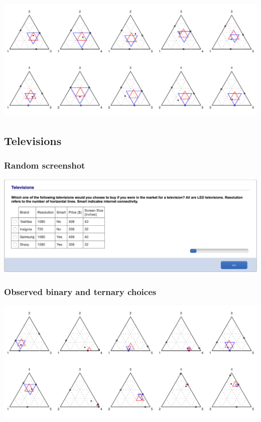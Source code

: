 \documentclass[11pt,letter]{article}
\begin{document}
\includegraphics[width=15cm]{./Population_study_data/Simplexes/Two-flight_itineraries.pdf}

\pagebreak

\subsection*{Televisions}



\subsubsection*{Random screenshot}

\includegraphics[width=15cm]{Population_study_design/screenshot_Televisions.png}

\subsubsection*{Observed binary and ternary choices}

\includegraphics[width=15cm]{./Population_study_data/Simplexes/Televisions.pdf}
\end{document}

